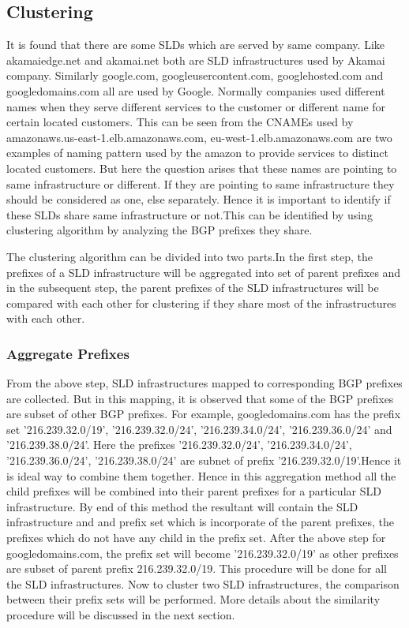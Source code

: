 \subsection{Clustering}
It is found that there are some SLDs which are served by same company. Like akamaiedge.net and akamai.net both are SLD infrastructures used by Akamai company. Similarly google.com, googleusercontent.com, googlehosted.com and googledomains.com all are used by Google. Normally companies used different names when they serve different services to the customer or different name for certain  located customers. This can be seen from the CNAMEs used by amazonaws.us-east-1.elb.amazonaws.com, eu-west-1.elb.amazonaws.com are two examples of naming pattern used by the amazon to provide services to distinct located customers. But here the question arises that these names are pointing to same infrastructure or different. If they are pointing to same infrastructure they should be considered as one, else separately. Hence it is important to identify if these SLDs share same infrastructure or not.This can be identified by using clustering algorithm by analyzing the BGP prefixes they share. 

The clustering algorithm can be divided into two parts.In the first step, the prefixes of a SLD infrastructure will be aggregated into set of parent prefixes and in
the subsequent step, the parent prefixes of the SLD infrastructures will be compared with each other for clustering if they share most of the infrastructures with each other.
\subsubsection{Aggregate Prefixes}
From the above step, SLD infrastructures mapped to corresponding BGP prefixes are collected. But in this mapping, it is observed that some of the BGP prefixes are subset of other BGP prefixes. For example, googledomains.com has the prefix set ’216.239.32.0/19’, ’216.239.32.0/24’, ’216.239.34.0/24’, ’216.239.36.0/24’ and ’216.239.38.0/24’. Here the prefixes ’216.239.32.0/24’, ’216.239.34.0/24’, ’216.239.36.0/24’, ’216.239.38.0/24’ are subnet of prefix ’216.239.32.0/19’.Hence it is ideal way to combine them together. Hence in this aggregation method all the child prefixes will be combined into their parent prefixes for a particular SLD infrastructure. By end of this method the resultant will contain the SLD infrastructure and and prefix set which is incorporate of the parent prefixes, the prefixes which do not have any child in the prefix set. After the above step for googledomains.com, the prefix set will become ’216.239.32.0/19’ as other prefixes are subset of parent prefix 216.239.32.0/19. This procedure will be done for all the SLD infrastructures. Now to cluster two SLD infrastructures, the comparison between their prefix sets will be performed. More details about the similarity procedure will be discussed in the next section.
